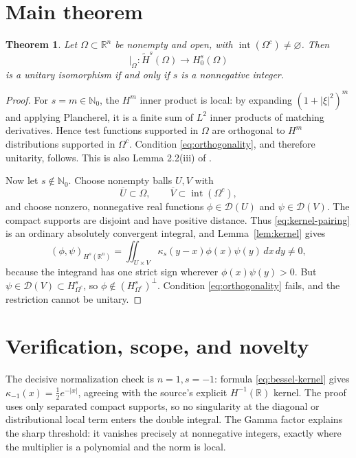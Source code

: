 \documentclass[10pt,a4paper]{article}
\newtheorem{theorem}{Theorem}
\newcommand{\R}{\mathbb R}
\newcommand{\N}{\mathbb N}
\newcommand{\D}{\mathcal D}
\begin{document}
\section{Main theorem}

\begin{theorem}\label{thm:main}
Let $\Omega\subset\R^n$ be nonempty and open, with
$\operatorname{int}(\Omega^c)\ne\varnothing$.  Then
\[
 |_{\Omega}:\widetilde H^s(\Omega)\longrightarrow H^s_0(\Omega)
\]
is a unitary isomorphism if and only if $s$ is a nonnegative integer.
\end{theorem}

\begin{proof}
For $s=m\in\N_0$, the $H^m$ inner product is local: by expanding
$(1+|\xi|^2)^m$ and applying Plancherel, it is a finite sum of $L^2$ inner
products of matching derivatives.  Hence test functions supported in
$\Omega$ are orthogonal to $H^m$ distributions supported in $\Omega^c$.
Condition \eqref{eq:orthogonality}, and therefore unitarity, follows.  This
is also Lemma 2.2(iii) of \cite{HM}.

Now let $s\notin\N_0$.  Choose nonempty balls $U,V$ with
\[
 \overline U\subset\Omega,
 \qquad
 \overline V\subset\operatorname{int}(\Omega^c),
\]
and choose nonzero, nonnegative real functions
$\phi\in\D(U)$ and $\psi\in\D(V)$.  The compact supports are disjoint and
have positive distance.  Thus \eqref{eq:kernel-pairing} is an ordinary
absolutely convergent integral, and Lemma~\ref{lem:kernel} gives
\[
 (\phi,\psi)_{H^s(\R^n)}
 =\iint_{U\times V}\kappa_s(y-x)\phi(x)\psi(y)\,dx\,dy\ne0,
\]
because the integrand has one strict sign wherever
$\phi(x)\psi(y)>0$.  But $\psi\in\D(V)\subset H^s_{\Omega^c}$, so
$\phi\notin(H^s_{\Omega^c})^\perp$.  Condition
\eqref{eq:orthogonality} fails, and the restriction cannot be unitary.
\end{proof}

\section{Verification, scope, and novelty}

The decisive normalization check is $n=1,s=-1$: formula
\eqref{eq:bessel-kernel} gives
$\kappa_{-1}(x)=\tfrac12e^{-|x|}$, agreeing with the source's explicit
$H^{-1}(\R)$ kernel.  The proof uses only separated compact supports, so no
singularity at the diagonal or distributional local term enters the double
integral.  The Gamma factor explains the sharp threshold: it vanishes
precisely at nonnegative integers, exactly where the multiplier is a
polynomial and the norm is local.
\end{document}

